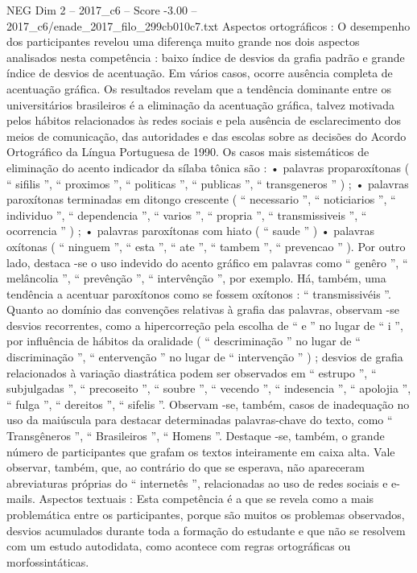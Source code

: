 \begin{textsample}{NEG Dim 2 – 2017\_c6 – Score -3.00 – 2017\_c6/enade\_2017\_filo\_299cb010c7.txt}
Aspectos ortográficos : O desempenho dos participantes revelou uma diferença muito grande nos dois aspectos analisados nesta competência : baixo índice de desvios da grafia padrão e grande índice de desvios de acentuação.
Em vários casos, ocorre ausência completa de acentuação gráfica.
Os resultados revelam que a tendência dominante entre os universitários brasileiros é a eliminação da acentuação gráfica, talvez motivada pelos hábitos relacionados às redes sociais e pela ausência de esclarecimento dos meios de comunicação, das autoridades e das escolas sobre as decisões do Acordo Ortográfico da Língua Portuguesa de 1990.
Os casos mais sistemáticos de eliminação do acento indicador da sílaba tônica são : • palavras proparoxítonas ( “ sifilis ”, “ proximos ”, “ politicas ”, “ publicas ”, “ transgeneros ” ) ; • palavras paroxítonas terminadas em ditongo crescente ( “ necessario ”, “ noticiarios ”, “ individuo ”, “ dependencia ”, “ varios ”, “ propria ”, “ transmissiveis ”, “ ocorrencia ” ) ; • palavras paroxítonas com hiato ( “ saude ” ) • palavras oxítonas ( “ ninguem ”, “ esta ”, “ ate ”, “ tambem ”, “ prevencao ” ).
Por outro lado, destaca -se o uso indevido do acento gráfico em palavras como “ genêro ”, “ melâncolia ”, “ prevênção ”, “ intervênção ”, por exemplo.
Há, também, uma tendência a acentuar paroxítonos como se fossem oxítonos : “ transmissivéis ”.
Quanto ao domínio das convenções relativas à grafia das palavras, observam -se desvios recorrentes, como a hipercorreção pela escolha de “ e ” no lugar de “ i ”, por influência de hábitos da oralidade ( “ descriminação ” no lugar de “ discriminação ”, “ entervenção ” no lugar de “ intervenção ” ) ; desvios de grafia relacionados à variação diastrática podem ser observados em “ estrupo ”, “ subjulgadas ”, “ precoseito ”, “ soubre ”, “ vecendo ”, “ indesencia ”, “ apolojia ”, “ fulga ”, “ dereitos ”, “ sifelis ”.
Observam -se, também, casos de inadequação no uso da maiúscula para destacar determinadas palavras-chave do texto, como “ Transgêneros ”, “ Brasileiros ”, “ Homens ”.
Destaque -se, também, o grande número de participantes que grafam os textos inteiramente em caixa alta.
Vale observar, também, que, ao contrário do que se esperava, não apareceram abreviaturas próprias do “ internetês ”, relacionadas ao uso de redes sociais e e-mails.
Aspectos textuais : Esta competência é a que se revela como a mais problemática entre os participantes, porque são muitos os problemas observados, desvios acumulados durante toda a formação do estudante e que não se resolvem com um estudo autodidata, como acontece com regras ortográficas ou morfossintáticas.

\end{textsample}
